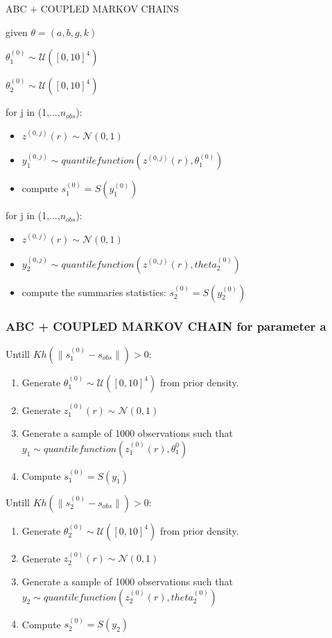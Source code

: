 \documentclass{beamer}
\begin{document}
\begin{section}{ABC + COUPLED MARKOV CHAINS}
	\begin{frame}
	given $\theta =( a,b,g,k )$
	
	$ \theta_{1}^{(0)} \sim \mathcal{U}([0,10]^4)$
	
	$ \theta_{2}^{(0)} \sim \mathcal{U}([0,10]^4)$
	
	for j in (1,...,$n_{obs}$):
	\begin{itemize}
		\item $z^{(0,j)}(r) \sim \mathcal{N}(0,1)  $
		
		\item $ y_{1}^{(0,j)} \sim quantilefunction(z^{(0,j)}(r),\theta_{1}^{(0)})$
		
		\item compute $ s_{1}^{(0)} =S(y_{1}^{(0)})$
	\end{itemize}
	for j in (1,...,$n_{obs}$):
	
	\begin{itemize}
		\item $z^{(0,j)}(r) \sim \mathcal{N}(0,1)  $
		
		\item $ y_{2}^{(0,j)} \sim quantile function(z^{(0,j)}(r),theta_{2}^{(0)})$
		
		\item compute the summaries statistics:
		$ s_{2}^{(0)} =S(y_{2}^{(0)})$
	\end{itemize}
	
\end{frame}
\begin{frame}
\frametitle{ABC + COUPLED MARKOV CHAIN for parameter a}
Untill $Kh(\|s_{1}^{(0)} - s_{obs}\|)>0$:
\begin{enumerate}
	\item Generate $\theta_{1}^{(0)} \sim \mathcal{U}([0,10]^4)$ from prior density.
	\item Generate $z_{1}^{(0)}(r) \sim \mathcal{N}(0,1)$
	\item Generate a sample of 1000 observations such that $y_{1} \sim quantile function(z_{1}^{(0)}(r),\theta_{1}^{0})$
	\item Compute $s_{1}^{(0)}=S(y_{1})$
	
\end{enumerate}
Untill $Kh(\|s_{2}^{(0)} - s_{obs}\|)>0$:
\begin{enumerate}
	\item Generate $\theta_{2}^{(0)} \sim \mathcal{U}([0,10]^4)$ from prior density.
	\item Generate $z_{2}^{(0)}(r) \sim \mathcal{N}(0,1)$
	\item Generate a sample of 1000 observations such that $y_{2} \sim quantile function(z_{2}^{(0)}(r),theta_{2}^{(0)})$
	\item Compute $s_{2}^{(0)}=S(y_{2})$
\end{enumerate}


\end{frame}
\end{section}
\end{document}
